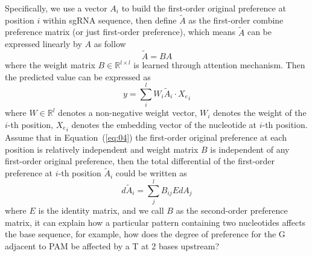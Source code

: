 \documentclass{bioinfo}
\begin{document}
 Specifically, we use a vector $A_i$ to build the first-order original preference at position $i$ within sgRNA sequence, then
 define $\tilde{A}$ as the first-order combine preference matrix (or just first-order preference), which means $\tilde{A}$ can be expressed linearly by $A$ as follow
\begin{equation}
\tilde{A}=BA\label{eq:04}
\end{equation}
where the weight matrix $B\in\mathbb{R}^{l\times l}$ is learned through attention mechanism. 
Then the predicted value can be expressed as
\begin{equation}
y=\sum_i^lW_i\tilde{A}_i\cdot {X_e}_i\label{eq:05}
\end{equation}
 where $W\in\mathbb{R}^l$ denotes a non-negative weight vector, $W_i$ denotes the weight of the $i$-th position, ${X_e}_i$ denotes the embedding vector of the nucleotide at $i$-th position.
 Assume that in Equation~(\ref{eq:04}) the first-order original preference at each position is relatively independent and weight matrix $B$ is independent of any first-order original preference, 
 then the total differential of the first-order preference at $i$-th position $\tilde{A}_i$ could be written as
\begin{equation}
d\tilde{A}_i=\sum_j^lB_{ij}EdA_j\label{eq:07}
\end{equation}
where $E$ is the identity matrix, and we call $B$ as the second-order preference matrix, 
it can explain how a particular pattern containing two nucleotides affects the base sequence, 
for example, how does the degree of preference for the G adjacent to PAM be affected by a T at 2 bases upstream?
\end{document}
